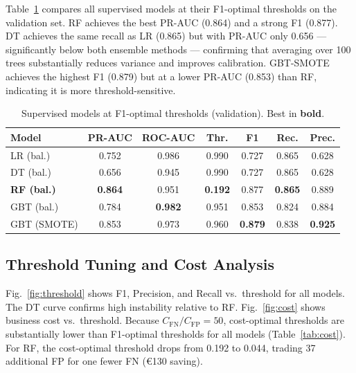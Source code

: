 \documentclass[conference]{IEEEtran}
\begin{document}
Table~\ref{tab:models} compares all supervised models at their F1-optimal
thresholds on the validation set. RF achieves the best PR-AUC (0.864) and a
strong F1 (0.877). DT achieves the same recall as LR (0.865) but with
PR-AUC only 0.656 --- significantly below both ensemble methods --- confirming
that averaging over 100 trees substantially reduces variance and improves
calibration. GBT-SMOTE achieves the highest F1 (0.879) but at a lower PR-AUC
(0.853) than RF, indicating it is more threshold-sensitive.

\begin{table}[t]
  \centering
  \caption{Supervised models at F1-optimal thresholds (validation). Best in \textbf{bold}.}
  \label{tab:models}
  \setlength{\tabcolsep}{3.5pt}
  \begin{tabular}{lcccccc}
    \toprule
    \textbf{Model} & \textbf{PR-AUC} & \textbf{ROC-AUC}
      & \textbf{Thr.} & \textbf{F1} & \textbf{Rec.} & \textbf{Prec.} \\
    \midrule
    LR (bal.)          & 0.752 & 0.986 & 0.990 & 0.727 & 0.865 & 0.628 \\
    DT (bal.)          & 0.656 & 0.945 & 0.990 & 0.727 & 0.865 & 0.628 \\
    \textbf{RF (bal.)} & \textbf{0.864} & 0.951 & \textbf{0.192}
                       & 0.877 & \textbf{0.865} & 0.889 \\
    GBT (bal.)         & 0.784 & \textbf{0.982} & 0.951 & 0.853 & 0.824 & 0.884 \\
    GBT (SMOTE)        & 0.853 & 0.973 & 0.960 & \textbf{0.879} & 0.838 & \textbf{0.925} \\
    \bottomrule
  \end{tabular}
\end{table}

\subsection{Threshold Tuning and Cost Analysis}

Fig.~\ref{fig:threshold} shows F1, Precision, and Recall vs.\ threshold for all
models. The DT curve confirms high instability relative to RF. Fig.~\ref{fig:cost}
shows business cost vs.\ threshold. Because $C_{\text{FN}}/C_{\text{FP}} = 50$,
cost-optimal thresholds are substantially lower than F1-optimal thresholds for all
models (Table~\ref{tab:cost}). For RF, the cost-optimal threshold drops from 0.192
to 0.044, trading 37 additional FP for one fewer FN (\euro130 saving).
\end{document}
